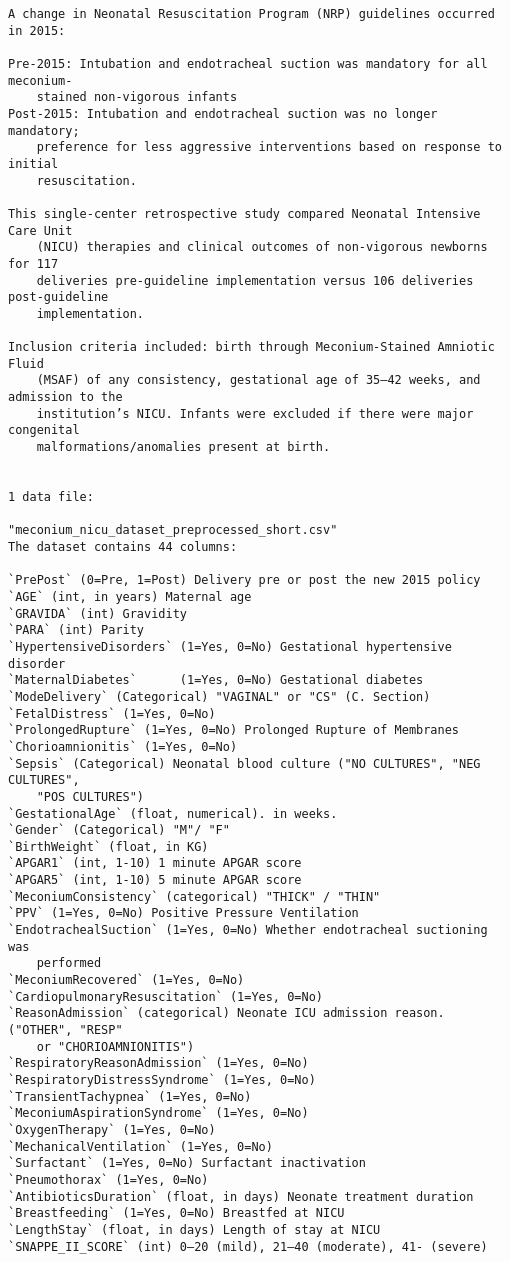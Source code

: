\documentclass[11pt]{article}
\begin{document}
\begin{Verbatim}[tabsize=4]
A change in Neonatal Resuscitation Program (NRP) guidelines occurred in 2015:

Pre-2015: Intubation and endotracheal suction was mandatory for all meconium-
	stained non-vigorous infants
Post-2015: Intubation and endotracheal suction was no longer mandatory;
	preference for less aggressive interventions based on response to initial
	resuscitation.

This single-center retrospective study compared Neonatal Intensive Care Unit
	(NICU) therapies and clinical outcomes of non-vigorous newborns for 117
	deliveries pre-guideline implementation versus 106 deliveries post-guideline
	implementation.

Inclusion criteria included: birth through Meconium-Stained Amniotic Fluid
	(MSAF) of any consistency, gestational age of 35–42 weeks, and admission to the
	institution’s NICU. Infants were excluded if there were major congenital
	malformations/anomalies present at birth.


1 data file:

"meconium_nicu_dataset_preprocessed_short.csv"
The dataset contains 44 columns:

`PrePost` (0=Pre, 1=Post) Delivery pre or post the new 2015 policy
`AGE` (int, in years) Maternal age
`GRAVIDA` (int) Gravidity
`PARA` (int) Parity
`HypertensiveDisorders` (1=Yes, 0=No) Gestational hypertensive disorder
`MaternalDiabetes`      (1=Yes, 0=No) Gestational diabetes
`ModeDelivery` (Categorical) "VAGINAL" or "CS" (C. Section)
`FetalDistress` (1=Yes, 0=No)
`ProlongedRupture` (1=Yes, 0=No) Prolonged Rupture of Membranes
`Chorioamnionitis` (1=Yes, 0=No)
`Sepsis` (Categorical) Neonatal blood culture ("NO CULTURES", "NEG CULTURES",
	"POS CULTURES")
`GestationalAge` (float, numerical). in weeks.
`Gender` (Categorical) "M"/ "F"
`BirthWeight` (float, in KG)
`APGAR1` (int, 1-10) 1 minute APGAR score
`APGAR5` (int, 1-10) 5 minute APGAR score
`MeconiumConsistency` (categorical) "THICK" / "THIN"
`PPV` (1=Yes, 0=No) Positive Pressure Ventilation
`EndotrachealSuction` (1=Yes, 0=No) Whether endotracheal suctioning was
	performed
`MeconiumRecovered` (1=Yes, 0=No)
`CardiopulmonaryResuscitation` (1=Yes, 0=No)
`ReasonAdmission` (categorical) Neonate ICU admission reason. ("OTHER", "RESP"
	or "CHORIOAMNIONITIS")
`RespiratoryReasonAdmission` (1=Yes, 0=No)
`RespiratoryDistressSyndrome` (1=Yes, 0=No)
`TransientTachypnea` (1=Yes, 0=No)
`MeconiumAspirationSyndrome` (1=Yes, 0=No)
`OxygenTherapy` (1=Yes, 0=No)
`MechanicalVentilation` (1=Yes, 0=No)
`Surfactant` (1=Yes, 0=No) Surfactant inactivation
`Pneumothorax` (1=Yes, 0=No)
`AntibioticsDuration` (float, in days) Neonate treatment duration
`Breastfeeding` (1=Yes, 0=No) Breastfed at NICU
`LengthStay` (float, in days) Length of stay at NICU
`SNAPPE_II_SCORE` (int) 0–20 (mild), 21–40 (moderate), 41- (severe)



\end{Verbatim}
\end{document}
